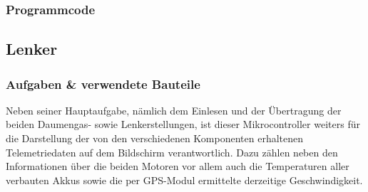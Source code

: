 \newpage
\subsubsection{Programmcode}

\newpage
\subsection{Lenker}
\subsubsection{Aufgaben \& verwendete Bauteile}
Neben seiner Hauptaufgabe, nämlich dem Einlesen und der Übertragung der beiden Daumengas- sowie Lenkerstellungen, ist dieser Mikrocontroller weiters für die Darstellung der von den verschiedenen Komponenten erhaltenen Telemetriedaten auf dem Bildschirm verantwortlich.
Dazu zählen neben den Informationen über die beiden Motoren vor allem auch die Temperaturen aller verbauten Akkus sowie die per GPS-Modul ermittelte derzeitige Geschwindigkeit.

